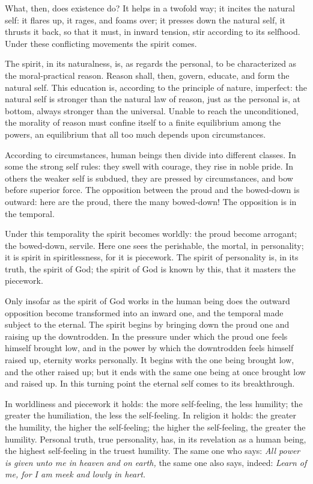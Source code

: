 \documentclass[12pt,a4paper]{book}
\begin{document}
What, then, does existence do? It helps in a twofold way; it incites the natural self: it flares up, it rages, and foams over; it presses down the natural self, it thrusts it back, so that it must, in inward tension, stir according to its selfhood. Under these conflicting movements the spirit comes.

The spirit, in its naturalness, is, as regards the personal, to be characterized as the moral-practical reason. Reason shall, then, govern, educate, and form the natural self. This education is, according to the principle of nature, imperfect: the natural self is stronger than the natural law of reason, just as the personal is, at bottom, always stronger than the universal. Unable to reach the unconditioned, the morality of reason must confine itself to a finite equilibrium among the powers, an equilibrium that all too much depends upon circumstances.

According to circumstances, human beings then divide into different classes. In some the strong self rules: they swell with courage, they rise in noble pride. In others the weaker self is subdued, they are pressed by circumstances, and bow before superior force. The opposition between the proud and the bowed-down is outward: here are the proud, there the many bowed-down! The opposition is in the temporal.

Under this temporality the spirit becomes worldly: the proud become arrogant; the bowed-down, servile. Here one sees the perishable, the mortal, in personality; it is spirit in spiritlessness, for it is piecework. The spirit of personality is, in its truth, the spirit of God; the spirit of God is known by this, that it masters the piecework.

Only insofar as the spirit of God works in the human being does the outward opposition become transformed into an inward one, and the temporal made subject to the eternal. The spirit begins by bringing down the proud one and raising up the downtrodden. In the pressure
under which the proud one feels himself brought low, and in the power by which the downtrodden feels himself raised up, eternity works personally. It begins with the one being brought low, and the other raised up; but it ends with the same one being at once brought low and raised up. In this turning point the eternal self comes to its breakthrough.

In worldliness and piecework it holds: the more self-feeling, the less humility; the greater the humiliation, the less the self-feeling. In religion it holds: the greater the humility, the higher the self-feeling; the higher the self-feeling, the greater the humility. Personal truth, true personality, has, in its revelation as a human being, the highest self-feeling in the truest humility. The same one who says: \emph{All power is given unto me in heaven and on earth,} the same one also says, indeed: \emph{Learn of me, for I am meek and lowly in heart.}
\end{document}
